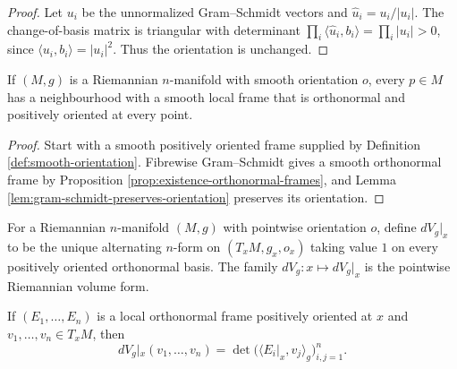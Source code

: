 \begin{proof}
\leanok
\sketch Let $u_i$ be the unnormalized Gram--Schmidt vectors and $\widehat u_i=u_i/|u_i|$. The change-of-basis matrix is triangular with determinant $\prod_i\langle\widehat u_i,b_i\rangle=\prod_i|u_i|>0$, since $\langle u_i,b_i\rangle=|u_i|^2$. Thus the orientation is unchanged.
\end{proof}

\begin{proposition}
\label{prop:oriented-orthonormal-frames}
\leanok
{}
If $(M,g)$ is a Riemannian $n$-manifold with smooth orientation $o$, every $p\in M$ has a neighbourhood with a smooth local frame that is orthonormal and positively oriented at every point.
\end{proposition}

\begin{proof}
\leanok
{}
\sketch Start with a smooth positively oriented frame supplied by Definition \ref{def:smooth-orientation}. Fibrewise Gram--Schmidt gives a smooth orthonormal frame by Proposition \ref{prop:existence-orthonormal-frames}, and Lemma \ref{lem:gram-schmidt-preserves-orientation} preserves its orientation.
\end{proof}

\begin{definition}
\label{def:volume-form-pointwise}
\leanok
{}
For a Riemannian $n$-manifold $(M,g)$ with pointwise orientation $o$, define $dV_g|_x$ to be the unique alternating $n$-form on $(T_xM,g_x,o_x)$ taking value $1$ on every positively oriented orthonormal basis. The family $dV_g:x\mapsto dV_g|_x$ is the pointwise Riemannian volume form.
\end{definition}

\begin{proposition}
\label{prop:volume-form-determinant}
\leanok
{}
If $(E_1,\ldots,E_n)$ is a local orthonormal frame positively oriented at $x$ and $v_1,\ldots,v_n\in T_xM$, then
\[
dV_g|_x(v_1,\ldots,v_n)=\det\bigl(\langle E_i|_x,v_j\rangle_g\bigr)_{i,j=1}^n.
\]
\end{proposition}

